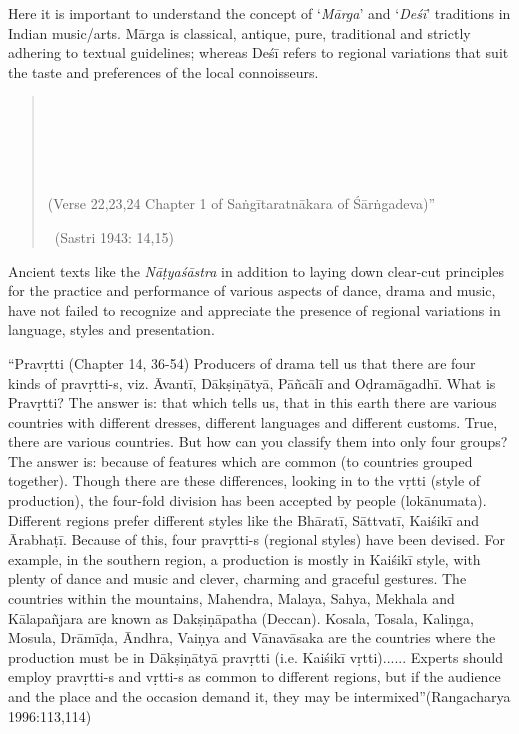 Here it is important to understand the concept of ‘\textit{Mārga}’ and ‘\textit{Deśī}’ traditions in Indian music/arts. Mārga is classical, antique, pure, traditional and strictly adhering to textual guidelines; whereas Deśī refers to regional variations that suit the taste and preferences of the local connoisseurs.

\begin{verse}
\\\\\\\\\\(Verse 22,23,24 Chapter 1 of Saṅgītaratnākara of Śārṅgadeva)”

~\hfill (Sastri 1943: 14,15)
\end{verse}

Ancient texts like the \textit{Nāṭyaśāstra} in addition to laying down clear-cut principles for the practice and performance of various aspects of dance, drama and music, have not failed to recognize and appreciate the presence of regional variations in language, styles and presentation.

\begin{myquote}
“Pravṛtti (Chapter 14, 36-54) Producers of drama tell us that there are four kinds of pravṛtti-s, viz. Āvantī, Dākṣiṇātyā, Pāñcālī and Oḍramāgadhī. What is Pravṛtti? The answer is: that which tells us, that in this earth there are various countries with different dresses, different languages and different customs. True, there are various countries. But how can you classify them into only four groups? The answer is: because of features which are common (to countries grouped together). Though there are these differences, looking in to the vṛtti (style of production), the four-fold division has been accepted by people (lokānumata). Different regions prefer different styles like the Bhāratī, Sāttvatī, Kaiśikī and Ārabhaṭī. Because of this, four pravṛtti-s (regional styles) have been devised. For example, in the southern region, a production is mostly in Kaiśikī style, with plenty of dance and music and clever, charming and graceful gestures. The countries within the mountains, Mahendra, Malaya, Sahya, Mekhala and Kālapañjara are known as Dakṣiṇāpatha (Deccan). Kosala, Tosala, Kaliṇga, Mosula, Drāmīḍa, Āndhra, Vaiṇya and Vānavāsaka are the countries where the production must be in Dākṣiṇātyā pravṛtti (i.e. Kaiśikī vṛtti)...... Experts should employ pravṛtti-s and vṛtti-s as common to different regions, but if the audience and the place and the occasion demand it, they may be intermixed”\hfill (Rangacharya 1996:113,114)
\end{myquote}

